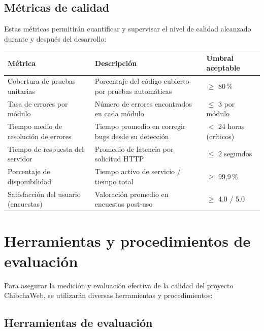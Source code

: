 \documentclass[12pt,a4paper]{article}
\begin{document}
\subsection{Métricas de calidad}

Estas métricas permitirán cuantificar y supervisar el nivel de calidad alcanzado durante y
después del desarrollo:

\begin{center}
\begin{tabularx}{\textwidth}{>{\raggedright}p{3.5cm} X >{\centering\arraybackslash}p{2.5cm}}
\toprule
\textbf{Métrica} & \textbf{Descripción} & \textbf{Umbral aceptable} \\
\midrule
Cobertura de pruebas unitarias
  & Porcentaje del código cubierto por pruebas automáticas
  & $\geq$ 80\,\% \\
Tasa de errores por módulo
  & Número de errores encontrados en cada módulo
  & $\leq$ 3 por módulo \\
Tiempo medio de resolución de errores
  & Tiempo promedio en corregir bugs desde su detección
  & $<$ 24 horas (críticos) \\
Tiempo de respuesta del servidor
  & Promedio de latencia por solicitud HTTP
  & $\leq$ 2 segundos \\
Porcentaje de disponibilidad
  & Tiempo activo de servicio / tiempo total
  & $\geq$ 99,9\,\% \\
Satisfacción del usuario (encuestas)
  & Valoración promedio en encuestas post-uso
  & $\geq$ 4.0 / 5.0 \\
\bottomrule
\end{tabularx}
\end{center}

\section{Herramientas y procedimientos de evaluación}

Para asegurar la medición y evaluación efectiva de la calidad del proyecto ChibchaWeb, se
utilizarán diversas herramientas y procedimientos:

\subsection{Herramientas de evaluación}
\end{document}
